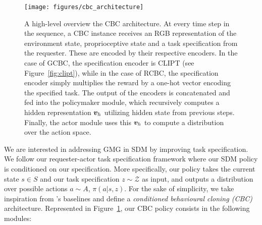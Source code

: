 \documentclass[../main.tex]{subfiles}
\begin{document}
\begin{figure}[t]
	\centering
	\texttt{[image: figures/cbc\_architecture]}
	\caption[A high-level overview the CBC architecture.]{A high-level overview the CBC architecture.
		At every time step in the sequence, a CBC instance receives an RGB representation of the
		environment state, proprioceptive state and a task specification from the requester. These are
		encoded by their respective encoders. In the case of GCBC, the specification encoder is CLIPT
		(see Figure~\ref{fig:clipt}), while in the case of RCBC, the specification encoder simply
		multiplies the reward by a one-hot vector encoding the specified task. The output of the
		encoders is concatenated and fed into the policymaker module, which recursively computes
		a hidden representation $\bm v_h$ utilizing hidden state from previous steps. Finally, the
		actor module uses this $\bm v_h$ to compute a distribution over the action space.}
	\label{fig:cbc}
\end{figure}

We are interested in addressing GMG in SDM by improving task specification. We follow our
requester-actor task specification framework where our SDM policy is conditioned on our
specification. More specifically, our policy takes the current state $s \in S$ and our task
specification $z \sim \mathcal{Z}$ as input, and outputs a distribution over possible actions $a
	\sim A$, $\pi(a \vert s, z)$. For the sake of simplicity, we take inspiration from
\citet{lynch_learning_2020}'s baselines and define a \emph{conditioned behavioural cloning (CBC)}
architecture. Represented in Figure~\ref{fig:cbc}, our CBC policy consists in the following modules:
\end{document}
